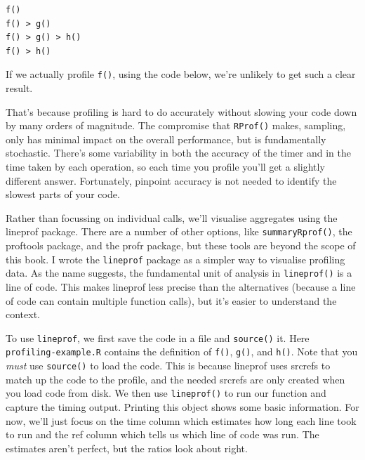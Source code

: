 \begin{verbatim}
f() 
f() > g()
f() > g() > h()
f() > h()
\end{verbatim}

If we actually profile \texttt{f()}, using the code below, we're
unlikely to get such a clear result.

\begin{Shaded}
\begin{Highlighting}[]
\StringTok{ }\NormalTok{()}
 \NormalTok{)}
\NormalTok{()}
\NormalTok{(}\NormalTok{)}
\end{Highlighting}
\end{Shaded}

That's because profiling is hard to do accurately without slowing your
code down by many orders of magnitude. The compromise that
\texttt{RProf()} makes, sampling, only has minimal impact on the overall
performance, but is fundamentally stochastic. There's some variability
in both the accuracy of the timer and in the time taken by each
operation, so each time you profile you'll get a slightly different
answer. Fortunately, pinpoint accuracy is not needed to identify the
slowest parts of your code. 

Rather than focussing on individual calls, we'll visualise aggregates
using the lineprof package. There are a number of other options, like
\texttt{summaryRprof()}, the proftools package, and the profr package,
but these tools are beyond the scope of this book. I wrote the
\texttt{lineprof} package as a simpler way to visualise profiling data.
As the name suggests, the fundamental unit of analysis in
\texttt{lineprof()} is a line of code. This makes lineprof less precise
than the alternatives (because a line of code can contain multiple
function calls), but it's easier to understand the context.

To use \texttt{lineprof}, we first save the code in a file and
\texttt{source()} it. Here \texttt{profiling-example.R} contains the
definition of \texttt{f()}, \texttt{g()}, and \texttt{h()}. Note that
you \emph{must} use \texttt{source()} to load the code. This is because
lineprof uses srcrefs to match up the code to the profile, and the
needed srcrefs are only created when you load code from disk. We then
use \texttt{lineprof()} to run our function and capture the timing
output. Printing this object shows some basic information. For now,
we'll just focus on the time column which estimates how long each line
took to run and the ref column which tells us which line of code was
run. The estimates aren't perfect, but the ratios look about right.

